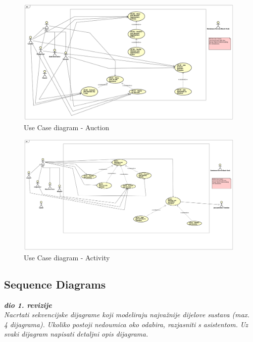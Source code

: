 	
				\begin{figure}[H]
					\includegraphics[width=\linewidth]{diagrams/uc-diag3-auction.png}
					\caption{Use Case diagram - Auction}
					\label{fig:uc_diag_3_auction}
				\end{figure}
			
				\begin{figure}[H]
					\includegraphics[width=\linewidth]{diagrams/uc-diag4-activity.png}
					\caption{Use Case diagram - Activity}
					\label{fig:uc_diag_4_activity}
				\end{figure}
				
			\subsection{Sequence Diagrams}
				
				\textbf{\textit{dio 1. revizije}}\\
				
				\textit{Nacrtati sekvencijske dijagrame koji modeliraju najvažnije dijelove sustava (max. 4 dijagrama). Ukoliko postoji nedoumica oko odabira, razjasniti s asistentom. Uz svaki dijagram napisati detaljni opis dijagrama.}
				
